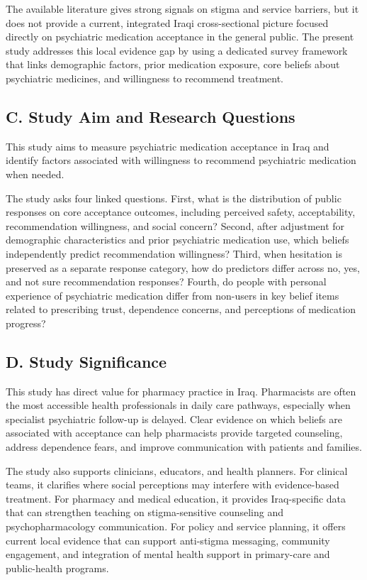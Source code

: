The available literature gives strong signals on stigma and service
barriers, but it does not provide a current, integrated Iraqi
cross-sectional picture focused directly on psychiatric medication
acceptance in the general public. The present study addresses this local
evidence gap by using a dedicated survey framework that links
demographic factors, prior medication exposure, core beliefs about
psychiatric medicines, and willingness to recommend treatment.

\subsection{C. Study Aim and Research
Questions}\label{c.-study-aim-and-research-questions}

This study aims to measure psychiatric medication acceptance in Iraq and
identify factors associated with willingness to recommend psychiatric
medication when needed.

The study asks four linked questions. First, what is the distribution of
public responses on core acceptance outcomes, including perceived
safety, acceptability, recommendation willingness, and social concern?
Second, after adjustment for demographic characteristics and prior
psychiatric medication use, which beliefs independently predict
recommendation willingness? Third, when hesitation is preserved as a
separate response category, how do predictors differ across no, yes, and
not sure recommendation responses? Fourth, do people with personal
experience of psychiatric medication differ from non-users in key belief
items related to prescribing trust, dependence concerns, and perceptions
of medication progress?

\subsection{D. Study Significance}\label{d.-study-significance}

This study has direct value for pharmacy practice in Iraq. Pharmacists
are often the most accessible health professionals in daily care
pathways, especially when specialist psychiatric follow-up is delayed.
Clear evidence on which beliefs are associated with acceptance can help
pharmacists provide targeted counseling, address dependence fears, and
improve communication with patients and families.

The study also supports clinicians, educators, and health planners. For
clinical teams, it clarifies where social perceptions may interfere with
evidence-based treatment. For pharmacy and medical education, it
provides Iraq-specific data that can strengthen teaching on
stigma-sensitive counseling and psychopharmacology communication. For
policy and service planning, it offers current local evidence that can
support anti-stigma messaging, community engagement, and integration of
mental health support in primary-care and public-health programs.

